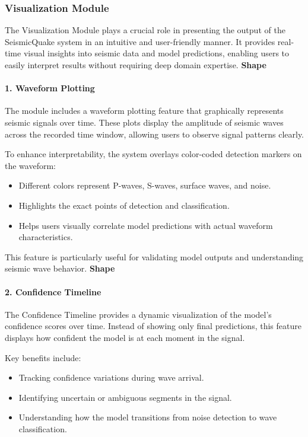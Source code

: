 \documentclass[a4paper,12pt]{report}
\begin{document}
\subsubsection{Visualization Module}
The Visualization Module plays a crucial role in presenting the output of the SeismicQuake system in an intuitive and user-friendly manner. It provides real-time visual insights into seismic data and model predictions, enabling users to easily interpret results without requiring deep domain expertise.
\textbf{Shape}

\paragraph{1. Waveform Plotting}
The module includes a waveform plotting feature that graphically represents seismic signals over time. These plots display the amplitude of seismic waves across the recorded time window, allowing users to observe signal patterns clearly.

To enhance interpretability, the system overlays color-coded detection markers on the waveform:
\begin{itemize}
\item Different colors represent P-waves, S-waves, surface waves, and noise.
\item Highlights the exact points of detection and classification.
\item Helps users visually correlate model predictions with actual waveform characteristics.
\end{itemize}

This feature is particularly useful for validating model outputs and understanding seismic wave behavior.
\textbf{Shape}

\paragraph{2. Confidence Timeline}
The Confidence Timeline provides a dynamic visualization of the model's confidence scores over time. Instead of showing only final predictions, this feature displays how confident the model is at each moment in the signal.

Key benefits include:
\begin{itemize}
\item Tracking confidence variations during wave arrival.
\item Identifying uncertain or ambiguous segments in the signal.
\item Understanding how the model transitions from noise detection to wave classification.
\end{itemize}
\end{document}
